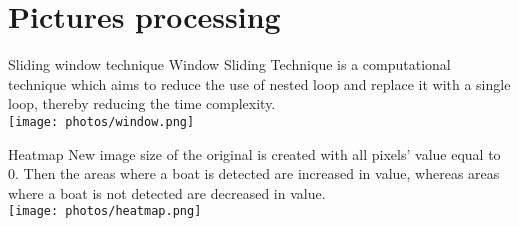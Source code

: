\documentclass{beamer}
\begin{document}
\section {Pictures processing}
\begin{frame}{Sliding window technique}
Window Sliding Technique is a computational technique which aims to reduce the use of nested loop and replace it with a single loop, thereby reducing the time complexity. \\
\texttt{[image: photos/window.png]}
\end{frame}

\begin{frame}{Heatmap}
    New image size of the original is created with all pixels’ value equal to 0. Then the areas where a boat is detected are increased in value, whereas areas where a boat is not detected are decreased in value. \\
    \texttt{[image: photos/heatmap.png]}

\end{frame}
\end{document}
